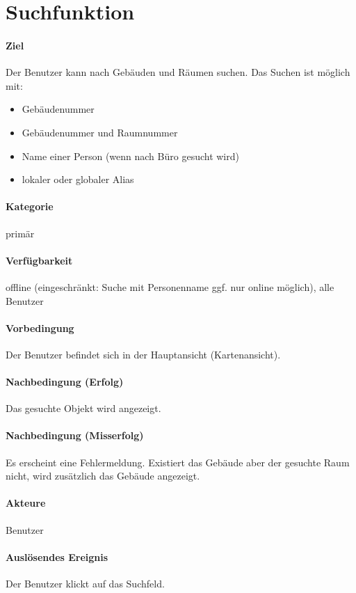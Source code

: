\section{Suchfunktion}
\paragraph{Ziel}
Der Benutzer kann nach Gebäuden und Räumen suchen. 
Das Suchen ist möglich mit:
\begin{itemize}
    \item Gebäudenummer
    \item Gebäudenummer und Raumnummer
    \item Name einer Person (wenn nach Büro gesucht wird)
    \item lokaler oder globaler Alias
\end{itemize}

\paragraph{Kategorie}
primär
\paragraph{Verfügbarkeit}
offline (eingeschränkt: Suche mit Personenname ggf. nur online möglich), alle Benutzer
\paragraph{Vorbedingung}
Der Benutzer befindet sich in der Hauptansicht (Kartenansicht).
\paragraph{Nachbedingung (Erfolg)}
Das gesuchte Objekt wird angezeigt.
\paragraph{Nachbedingung (Misserfolg)}
Es erscheint eine Fehlermeldung. Existiert das Gebäude aber der gesuchte Raum nicht, wird zusätzlich das Gebäude angezeigt.
\paragraph{Akteure}
Benutzer
\paragraph{Auslösendes Ereignis}
Der Benutzer klickt auf das Suchfeld.
